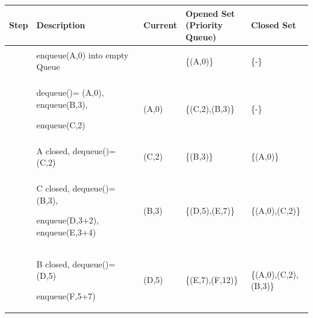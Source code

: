 \begin{table}[H]
{
\renewcommand{\arraystretch}{1}
\centering
\begin{tabular}{|m{1cm}|m{6.4cm}|m{1.6cm}|m{2.6cm}|m{3.3cm}|}
\hline
\begin{center}\cellcolor{green!25}\textbf{Step}\end{center}& \centering\cellcolor{green!25}\textbf{Description} & \centering\cellcolor{yellow!25}\textbf{Current} & \centering\cellcolor{red!25}\textbf{Opened Set\\(Priority Queue)} & \begin{center}\cellcolor{gray!25}\textbf{Closed Set}\end{center} \\ \hline
   \centering 0 & enqueue(A,0) into empty Queue & & \begin{center} \{(A,0)\} \end{center} & \begin{center} \{-\} \end{center} \\ \hline
   \centering 1 & dequeue()= (A,0), enqueue(B,3),\par enqueue(C,2) & \begin{center} (A,0) \end{center}& \begin{center} \{(C,2),(B,3)\} \end{center} &  \begin{center} \{-\} \end{center} \\ \hline
   \centering 2 & A closed, dequeue()= (C,2) & \begin{center} (C,2) \end{center}& \begin{center} \{(B,3)\} \end{center} & \begin{center} \{(A,0)\} \end{center}\\ \hline 
   \centering 3 & C closed, dequeue()= (B,3),\par enqueue(D,3+2), enqueue(E,3+4) & \begin{center} (B,3) \end{center} & \begin{center} \{(D,5),(E,7)\} \end{center} & \begin{center} \{(A,0),(C,2)\} \end{center} \\ \hline 
   \centering 4 & B closed, dequeue()= (D,5) \par enqueue(F,5+7) & \begin{center} (D,5) \end{center} & \begin{center} \{(E,7),(F,12)\} \end{center} & \begin{center} \{(A,0),(C,2),(B,3)\} \end{center} \\ \hline 

\end{tabular}}
\end{table}
